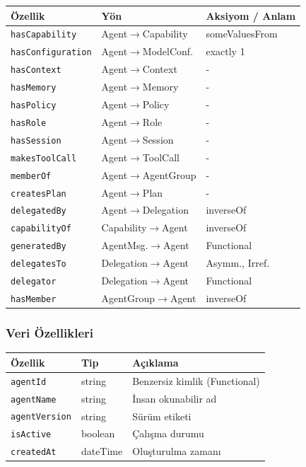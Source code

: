 \documentclass[10pt, a4paper, twocolumn]{article}
\begin{document}
\begin{center}
\tiny
\begin{tabular}{|p{2.1cm}|p{1.6cm}|p{2.3cm}|}
\hline
\textbf{Özellik} & \textbf{Yön} & \textbf{Aksiyom / Anlam} \\
\hline
\texttt{hasCapability} & Agent$\to$Capability & someValuesFrom \\
\hline
\texttt{hasConfiguration} & Agent$\to$ModelConf. & exactly 1 \\
\hline
\texttt{hasContext} & Agent$\to$Context & {-} \\
\hline
\texttt{hasMemory} & Agent$\to$Memory & {-} \\
\hline
\texttt{hasPolicy} & Agent$\to$Policy & {-} \\
\hline
\texttt{hasRole} & Agent$\to$Role & {-} \\
\hline
\texttt{hasSession} & Agent$\to$Session & {-} \\
\hline
\texttt{makesToolCall} & Agent$\to$ToolCall & {-} \\
\hline
\texttt{memberOf} & Agent$\to$AgentGroup & {-} \\
\hline
\texttt{createsPlan} & Agent$\to$Plan & {-} \\
\hline
\texttt{delegatedBy} & Agent$\to$Delegation & inverseOf \\
\hline
\texttt{capabilityOf} & Capability$\to$Agent & inverseOf \\
\hline
\texttt{generatedBy} & AgentMsg.$\to$Agent & Functional \\
\hline
\texttt{delegatesTo} & Delegation$\to$Agent & Asymm., Irref. \\
\hline
\texttt{delegator} & Delegation$\to$Agent & Functional \\
\hline
\texttt{hasMember} & AgentGroup$\to$Agent & inverseOf \\
\hline
\end{tabular}
\label{tab:agent-obj}
\end{center}

\subsubsection*{Veri Özellikleri}

\begin{center}
\tiny
\begin{tabular}{|p{2.1cm}|p{1.4cm}|p{2.5cm}|}
\hline
\textbf{Özellik} & \textbf{Tip} & \textbf{Açıklama} \\
\hline
\texttt{agentId} & string & Benzersiz kimlik (Functional) \\
\hline
\texttt{agentName} & string & İnsan okunabilir ad \\
\hline
\texttt{agentVersion} & string & Sürüm etiketi \\
\hline
\texttt{isActive} & boolean & Çalışma durumu \\
\hline
\texttt{createdAt} & dateTime & Oluşturulma zamanı \\
\hline
\end{tabular}
\label{tab:agent-data}
\end{center}
\end{document}
